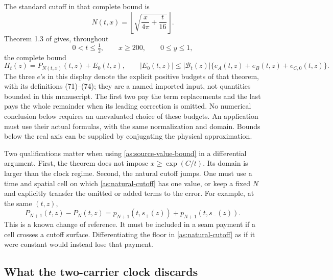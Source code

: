 The standard cutoff in that complete bound is
\begin{equation}
 N(t,x)=\left\lfloor\sqrt{\frac{x}{4\pi}+\frac{t}{16}}\right\rfloor.
 \label{as:natural-cutoff}
\end{equation}
Theorem 1.3 of \cite{Polymath2019} gives, throughout
\begin{equation}
 0<t\le\tfrac12,\qquad x\ge200,\qquad 0\le y\le1,
 \label{as:source-domain}
\end{equation}
the complete bound
\begin{equation}
 H_t(z)=P_{N(t,x)}(t,z)+E_0(t,z),\qquad
 |E_0(t,z)|\le |\mathcal B_t(z)|
             \{e_A(t,z)+e_B(t,z)+e_{C,0}(t,z)\}.
 \label{as:source-value-bound}
\end{equation}
The three $e$'s in this display denote the explicit positive budgets of
that theorem, with its definitions (71)--(74); they are a named imported
input, not quantities bounded in this manuscript.  The first two pay
the term replacements and the last pays the whole remainder when its
leading correction is omitted.  No numerical conclusion below requires
an unevaluated choice of these budgets.  An application must use their
actual formulas, with the same normalization and domain.  Bounds below
the real axis can be supplied by conjugating the physical approximation.

Two qualifications matter when using \eqref{as:source-value-bound} in
a differential argument.  First, the theorem does not impose
$x\ge\exp(C/t)$.  Its domain is larger than the clock regime.  Second,
the natural cutoff jumps.  One must use a time and spatial cell on
which \eqref{as:natural-cutoff} has one value, or keep a fixed $N$ and
explicitly transfer the omitted or added terms to the error.  For example,
at the same $(t,z)$,
\begin{equation}
 P_{N+1}(t,z)-P_N(t,z)
       =p_{N+1}(t,s_+(z))+p_{N+1}(t,s_-(z)).
 \label{as:cutoff-jump}
\end{equation}
This is a known change of reference.  It must be included in a seam
payment if a cell crosses a cutoff surface.  Differentiating the floor
in \eqref{as:natural-cutoff} as if it were constant would instead lose
that payment.

\subsection{What the two-carrier clock discards}

